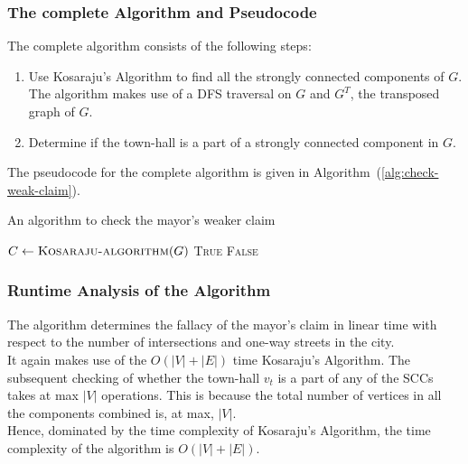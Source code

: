 \documentclass[12pt]{report}
\begin{document}
    \subsubsection*{The complete Algorithm and Pseudocode}
    The complete algorithm consists of the following steps:
    \begin{enumerate}
        \item
        Use Kosaraju's Algorithm to find all the strongly connected components of $G$.
        The algorithm makes use of a DFS traversal on $G$ and $G^{T}$, the transposed graph of $G$.
        \item Determine if the town-hall is a part of a strongly connected component in $G$.
    \end{enumerate}
    The pseudocode for the complete algorithm is given in Algorithm~(\ref{alg:check-weak-claim}).

    \begin{algorithm}
        \caption{An algorithm to check the mayor's weaker claim}
        \label{alg:check-weak-claim}
        \begin{algorithmic}[1]
            \State $C \gets \Call{Kosaraju-algorithm}{G}$ 
                    \State \Return \textsc{True}
                \EndIf
            \EndFor
            \State \Return \textsc{False}
            \EndProcedure
        \end{algorithmic}
    \end{algorithm}

    \subsubsection*{Runtime Analysis of the Algorithm}
    The algorithm determines the fallacy of the mayor's claim in linear time with respect to the number of intersections and one-way streets in the city. \\
    It again makes use of the $O(|V|+|E|)$ time Kosaraju's Algorithm.
    The subsequent checking of whether the town-hall $v_{t}$ is a part of any of the SCCs takes at max $|V|$ operations.
    This is because the total number of vertices in all the components combined is, at max, $|V|$.
    \vspace*{10pt} \\
    Hence, dominated by the time complexity of Kosaraju's Algorithm, the time complexity of the algorithm is $O(|V|+|E|)$.
\end{document}
